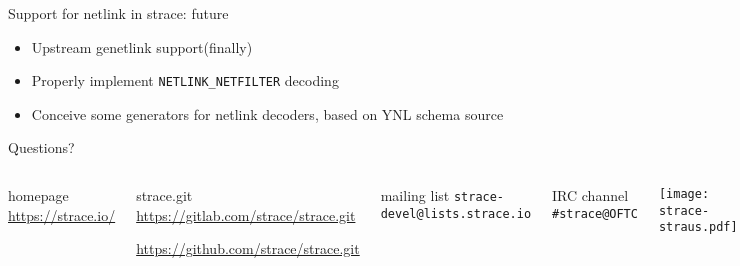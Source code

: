 \documentclass[unicode,aspectratio=169]{beamer}
\begin{document}
\begin{frame}{Support for netlink in strace: future}
\begin{itemize}
  \item Upstream genetlink support\footnotemark[1]\footnotemark[2] (finally)
  \item Properly implement \texttt{NETLINK\_NETFILTER} decoding
  \item Conceive some generators for netlink decoders, based on YNL schema
        source
\end{itemize}
\end{frame}

{
\begin{frame}{Questions?}
	\begin{columns}
		\column{7.5cm}
\begin{block}{\large homepage}
	\url{https://strace.io/}
\end{block}
\begin{block}{\large strace.git}
	\url{https://gitlab.com/strace/strace.git}

	\url{https://github.com/strace/strace.git}
\end{block}
\begin{block}{\large mailing list}
	\texttt{strace-devel@lists.strace.io}
\end{block}
\begin{block}{\large IRC channel}
	\texttt{\#strace@OFTC}
\end{block}
		\column{2.8cm}
			\centerline{\texttt{[image: strace-straus.pdf]}}
	\end{columns}
\end{frame}
}
\end{document}
